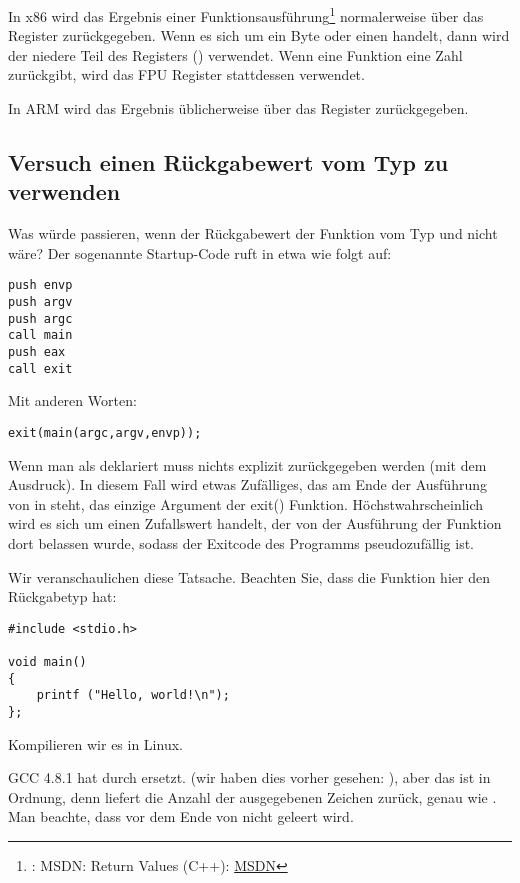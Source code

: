 
In x86 wird das Ergebnis einer Funktionsausführung\footnote{\Seealso: MSDN: Return Values (C++):
\href{http://go.yurichev.com/17258}{MSDN}} normalerweise über das \EAX Register zurückgegeben.
Wenn es sich um ein Byte oder einen \Tchar handelt, dann wird der niedere Teil des Registers \EAX (\AL) verwendet.
Wenn eine Funktion eine \Tfloat Zahl zurückgibt, wird das FPU Register  stattdessen verwendet.

In ARM wird das Ergebnis üblicherweise über das  Register zurückgegeben.

\subsection{Versuch einen Rückgabewert vom Typ \Tvoid zu verwenden}
Was würde passieren, wenn der Rückgabewert der Funktion \main vom Typ \Tvoid und nicht \Tint wäre?
Der sogenannte Startup-Code ruft \main in etwa wie folgt auf:

\begin{lstlisting}[style=customasmx86]
push envp
push argv
push argc
call main
push eax
call exit
\end{lstlisting}

Mit anderen Worten:

\begin{lstlisting}[style=customc]
exit(main(argc,argv,envp));
\end{lstlisting}
Wenn man \main als \Tvoid deklariert muss nichts explizit zurückgegeben werden (mit dem  Ausdruck). In diesem
Fall wird etwas Zufälliges, das am Ende der Ausführung von \main in \EAX steht, das einzige Argument der exit()
Funktion.
Höchstwahrscheinlich wird es sich um einen Zufallswert handelt, der von der Ausführung der Funktion dort belassen wurde,
sodass der Exitcode des Programms pseudozufällig ist.
\par
Wir veranschaulichen diese Tatsache. 
Beachten Sie, dass die Funktion \main hier den Rückgabetyp \Tvoid hat: 

\begin{lstlisting}[style=customc]
#include <stdio.h>

void main()
{
	printf ("Hello, world!\n");
};
\end{lstlisting}

Kompilieren wir es in Linux.

GCC 4.8.1 hat \printf durch \puts ersetzt. 
(wir haben dies vorher gesehen: ), aber das ist in Ordnung,
denn \puts liefert die Anzahl der ausgegebenen Zeichen zurück, genau wie \printf.
Man beachte, dass \EAX vor dem Ende von \main nicht geleert wird.

